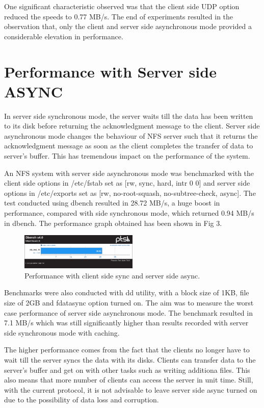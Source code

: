 \documentclass[conference]{IEEEtran}
\begin{document}
One significant characteristic observed was that the client side UDP option 
reduced the speeds to 0.77 MB/s. The end of experiments resulted in the 
observation that, only the client and server side asynchronous mode provided
a considerable elevation in performance. 

\section{Performance with Server side ASYNC}
In server side synchronous mode, the server waits till the data has been 
written to its disk before returning the acknowledgment message to the 
client. Server side asynchronous mode changes the behaviour of NFS server 
such that it returns the acknowledgment message as soon as the client 
completes the transfer of data to server's buffer. This has tremendous
impact on the performance of the system.

An NFS system with server side asynchronous mode was benchmarked with the
client side options in /etc/fstab set as [rw, sync, hard, intr 0 0] and
server side options in /etc/exports set as 
[rw, no-root-squash, no-subtree-check, async]. The test conducted using
dbench resulted in 28.72 MB/s, a huge boost in performance, compared with
side synchronous mode, which returned 0.94 MB/s in dbench. The performance
graph obtained has been shown in Fig 3.
\begin{figure}[htbp]
\centerline{\includegraphics[width=0.5\textwidth,natwidth=400,natheight=300]{server_async_fig.png}}
\caption{Performance with client side sync and server side async.}
\label{fig}
\end{figure}
Benchmarks were also conducted with dd utility, with a block size of 1KB,
file size of 2GB and fdatasync option turned on. The aim was to measure the
worst case performance of server side asynchronous mode. The benchmark
resulted in 7.1 MB/s which was still significantly higher than results
recorded with server side synchronous mode with caching.

The higher performance comes from the fact that the clients no longer have
to wait till the server syncs the data with its disks. Clients can transfer
data to the server's buffer and get on with other tasks such as writing
additiona files. This also means that more number of clients can access the
server in unit time. Still, with the current protocol, it is not advisable
to leave server side async turned on due to the possibility of data loss and
corruption.
\end{document}
